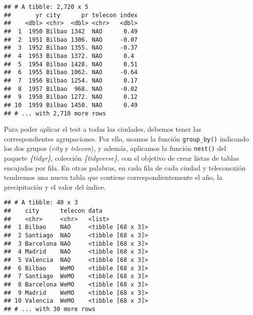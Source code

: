 \documentclass[]{article}
\newenvironment{Shaded}{\begin{snugshade}}{\end{snugshade}}
\newcommand{\KeywordTok}[1]{\textcolor[rgb]{0.13,0.29,0.53}{\textbf{#1}}}
\newcommand{\StringTok}[1]{\textcolor[rgb]{0.31,0.60,0.02}{#1}}
\newcommand{\OperatorTok}[1]{\textcolor[rgb]{0.81,0.36,0.00}{\textbf{#1}}}
\newcommand{\NormalTok}[1]{#1}
\begin{document}
\begin{Shaded}
\end{Shaded}

\begin{verbatim}
## # A tibble: 2,720 x 5
##       yr city      pr telecon index
##    <dbl> <chr>  <dbl> <chr>   <dbl>
##  1  1950 Bilbao 1342  NAO      0.49
##  2  1951 Bilbao 1306. NAO     -0.07
##  3  1952 Bilbao 1355. NAO     -0.37
##  4  1953 Bilbao 1372. NAO      0.4 
##  5  1954 Bilbao 1428. NAO      0.51
##  6  1955 Bilbao 1062. NAO     -0.64
##  7  1956 Bilbao 1254. NAO      0.17
##  8  1957 Bilbao  968. NAO     -0.02
##  9  1958 Bilbao 1272. NAO      0.12
## 10  1959 Bilbao 1450. NAO      0.49
## # ... with 2,710 more rows
\end{verbatim}

Para poder aplicar el test a todas las ciudades, debemos tener las
correspondientes agrupaciones. Por ello, usamos la función
\texttt{group\_by()} indicando los dos grupos (\emph{city} y
\emph{telecon}), y además, aplicamos la función \texttt{nest()} del
paquete \emph{\{tidyr\}}, colección \emph{\{tidyverse\}}, con el
objetivo de crear listas de tablas encajadas por fila. En otras
palabras, en cada fila de cada ciudad y teleconexión tendremos una nueva
tabla que contiene correspondientemente el año, la precipitación y el
valor del índice.

\begin{Shaded}
\end{Shaded}

\begin{verbatim}
## # A tibble: 40 x 3
##    city      telecon data             
##    <chr>     <chr>   <list>           
##  1 Bilbao    NAO     <tibble [68 x 3]>
##  2 Santiago  NAO     <tibble [68 x 3]>
##  3 Barcelona NAO     <tibble [68 x 3]>
##  4 Madrid    NAO     <tibble [68 x 3]>
##  5 Valencia  NAO     <tibble [68 x 3]>
##  6 Bilbao    WeMO    <tibble [68 x 3]>
##  7 Santiago  WeMO    <tibble [68 x 3]>
##  8 Barcelona WeMO    <tibble [68 x 3]>
##  9 Madrid    WeMO    <tibble [68 x 3]>
## 10 Valencia  WeMO    <tibble [68 x 3]>
## # ... with 30 more rows
\end{verbatim}
\end{document}
